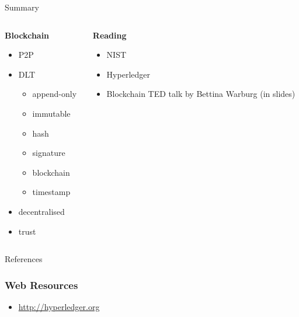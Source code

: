 \documentclass[pdf,table]{beamer}
\begin{document}
\begin{frame}{Summary}
	\begin{columns}[T]
		\begin{column}{0.48\textwidth}
			{\bf Blockchain}
			\begin{itemize}
				\item P2P
				\item DLT
					\begin{itemize}
						\item append-only
						\item immutable
						\item hash
						\item signature
						\item blockchain
						\item timestamp
					\end{itemize}
				\item decentralised
				\item trust
			\end{itemize}
		\end{column}
		\begin{column}{0.48\textwidth}
			{\bf Reading}
			\begin{itemize}
				\item NIST \cite{yaga2018blockchain}
				\item Hyperledger \cite{hyperledger:1,hyperledger:2}
				\item Blockchain TED talk by Bettina Warburg (in slides)
			\end{itemize}
		\end{column}
	\end{columns}	
\end{frame}



\begin{frame}[allowframebreaks]{References}
%    	
%		
	\printbibliography
\end{frame}
	
\begin{frame}
	\frametitle{Web Resources}
	\begin{itemize}
	\item \url{http://hyperledger.org}
	\end{itemize}
\end{frame}
\end{document}
